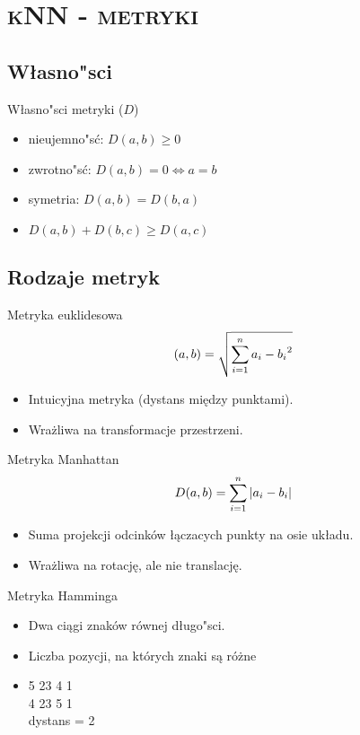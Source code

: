 \section{\scshape kNN - metryki}

\subsection{Własno"sci}
\begin{frame}{Własno"sci metryki ($D$)}
\begin{itemize}
	\item nieujemno"sć: $D(a,b) \ge 0$
	\item zwrotno"sć: $D(a,b) = 0 \Leftrightarrow a = b$
	\item symetria: $D(a,b) = D(b,a)$
	\item $D(a,b) + D(b,c) \ge D(a,c)$
\end{itemize}
\end{frame}

\subsection{Rodzaje metryk}
\begin{frame}{Metryka euklidesowa}
\begin{equation}
	\centering
	(a,b) = \sqrt{\sum_{i=1}^n{a_i - b_i}^2}
\end{equation}
\begin{itemize}
	\item Intuicyjna metryka (dystans między punktami).
	\item Wrażliwa na transformacje przestrzeni.
\end{itemize}
\end{frame}

\begin{frame}{Metryka Manhattan}
\begin{equation}
	\centering
	D(a,b) = \sum_{i=1}^n{|a_i - b_i|}
\end{equation}
\begin{itemize}
	\item Suma projekcji odcinków łączacych punkty na osie układu.
	\item Wrażliwa na rotację, ale nie translację.
\end{itemize}
\end{frame}

\begin{frame}{Metryka Hamminga}
\begin{itemize}
	\item Dwa ciągi znaków równej długo"sci.
	\item Liczba pozycji, na których znaki są różne
	\item {\color[rgb]{1,0,0} 5}{\color[rgb]{0,1,0} 	  23}{\color[rgb]{1,0,0} 4}{\color[rgb]{0,1,0} 1} \\
    {\color[rgb]{1,0,0} 4}{\color[rgb]{0,1,0} 23}{\color[rgb]{1,0,0} 5}{\color[rgb]{0,1,0} 1} \\
		  dystans = 2
\end{itemize}
\end{frame}

